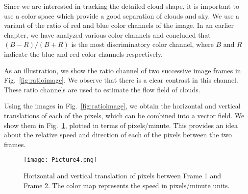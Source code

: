 Since we are interested in tracking the detailed cloud shape, it is important to use a color space which provide a good separation of clouds and sky. We use a variant of the ratio of red and blue color channels of the image. In an earlier chapter, we have analyzed various color channels and concluded that $(B-R)/(B+R)$ is the most discriminatory color channel, where $B$ and $R$ indicate the blue and red color channels respectively.

As an illustration, we show the ratio channel of two successive image frames in Fig.~\ref{fig:ratioimage}. We observe that there is a clear contrast in this channel. These ratio channels are used to estimate the flow field of clouds.



Using the images in Fig.~\ref{fig:ratioimage}, we obtain the horizontal and vertical translations of each of the pixels, which can be combined into a vector field. We show them in Fig.~\ref{fig:vectorflow}, plotted in terms of pixels/minute. This provides an idea about the relative speed and direction of each of the pixels between the two frames.

\begin{figure}[htb]
\begin{center}
\texttt{[image: Picture4.png]}
\caption[Horizontal and vertical translation of pixels between two successive sky/cloud image frames.]{Horizontal and vertical translation of pixels between Frame 1 and Frame 2. The color map represents the speed in pixels/minute units.
\label{fig:vectorflow}}
\end{center}
\end{figure}

